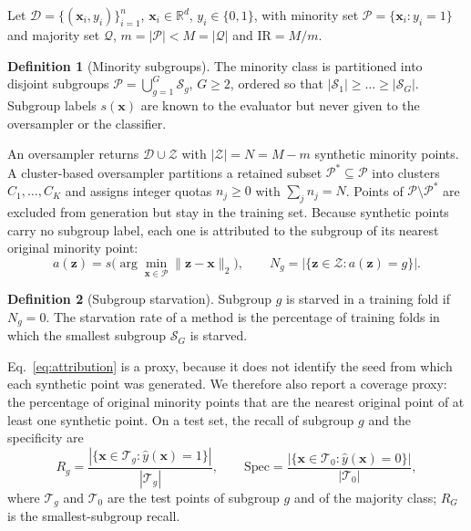\documentclass[preprint,nopreprintline]{elsarticle}
\theoremstyle{plain}
\theoremstyle{definition}
\newtheorem{definition}{Definition}
\newcommand{\rg}{R_{G}}
\begin{document}
Let $\mathcal{D}=\{(\mathbf{x}_i,y_i)\}_{i=1}^{n}$, $\mathbf{x}_i\in\mathbb{R}^d$, $y_i\in\{0,1\}$, with minority set $\mathcal{P}=\{\mathbf{x}_i:y_i=1\}$ and majority set $\mathcal{Q}$, $m=|\mathcal{P}|<M=|\mathcal{Q}|$ and $\mathrm{IR}=M/m$.

\begin{definition}[Minority subgroups]\label{def:subgroups}
The minority class is partitioned into disjoint subgroups $\mathcal{P}=\bigcup_{g=1}^{G}\mathcal{S}_g$, $G\ge2$, ordered so that $|\mathcal{S}_1|\ge\dots\ge|\mathcal{S}_G|$. Subgroup labels $s(\mathbf{x})$ are known to the evaluator but never given to the oversampler or the classifier.
\end{definition}

An oversampler returns $\mathcal{D}\cup\mathcal{Z}$ with $|\mathcal{Z}|=N=M-m$ synthetic minority points. A cluster-based oversampler partitions a retained subset $\mathcal{P}^{*}\subseteq\mathcal{P}$ into clusters $C_1,\dots,C_K$ and assigns integer quotas $n_j\ge0$ with $\sum_jn_j=N$. Points of $\mathcal{P}\setminus\mathcal{P}^{*}$ are excluded from generation but stay in the training set. Because synthetic points carry no subgroup label, each one is attributed to the subgroup of its nearest original minority point:
\begin{equation}\label{eq:attribution}
a(\mathbf{z})=s\bigl(\arg\min_{\mathbf{x}\in\mathcal{P}}\lVert\mathbf{z}-\mathbf{x}\rVert_2\bigr),\qquad N_g=|\{\mathbf{z}\in\mathcal{Z}:a(\mathbf{z})=g\}|.
\end{equation}

\begin{definition}[Subgroup starvation]\label{def:starvation}
Subgroup $g$ is starved in a training fold if $N_g=0$. The starvation rate of a method is the percentage of training folds in which the smallest subgroup $\mathcal{S}_G$ is starved.
\end{definition}

Eq.~\eqref{eq:attribution} is a proxy, because it does not identify the seed from which each synthetic point was generated. We therefore also report a coverage proxy: the percentage of original minority points that are the nearest original point of at least one synthetic point. On a test set, the recall of subgroup $g$ and the specificity are
\begin{equation}\label{eq:subrecall}
R_g=\frac{|\{\mathbf{x}\in\mathcal{T}_g:\hat y(\mathbf{x})=1\}|}{|\mathcal{T}_g|},\qquad \mathrm{Spec}=\frac{|\{\mathbf{x}\in\mathcal{T}_0:\hat y(\mathbf{x})=0\}|}{|\mathcal{T}_0|},
\end{equation}
where $\mathcal{T}_g$ and $\mathcal{T}_0$ are the test points of subgroup $g$ and of the majority class; $\rg$ is the smallest-subgroup recall.
\end{document}
